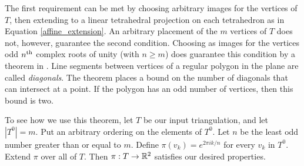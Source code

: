 The first requirement can be met by choosing arbitrary images for the vertices of $T$, then extending to a linear tetrahedral projection on each tetrahedron as in Equation \ref{affine_extension}.
An arbitrary placement of the $m$ vertices of $T$ does not, however, guarantee the second condition.
Choosing as images for the vertices odd $n^{\text{th}}$ complex roots of unity (with $n\geq m$) does guarantee this condition by a theorem in \cite{PoonRub98}.
Line segments between vertices of a regular polygon in the plane are called \emph{diagonals}.
The theorem places a bound on the number of diagonals that can intersect at a point.
If the polygon has an odd number of vertices, then this bound is two.

To see how we use this theorem, let $T$ be our input triangulation, and let $|T^0|=m$.
Put an arbitrary ordering on the elements of $T^0$.
Let $n$ be the least odd number greater than or equal to $m$.
Define $\pi(v_k)=e^{2\pi i k/n}$ for every $v_k$ in $T^0$.
Extend $\pi$ over all of $T$.
Then $\pi:T\to\mathbb{R}^2$ satisfies our desired properties.
